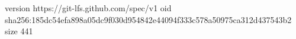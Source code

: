 version https://git-lfs.github.com/spec/v1
oid sha256:185dc54efa898a05dc9f030d954842e44094f333c578a50975ca312d437543b2
size 441
